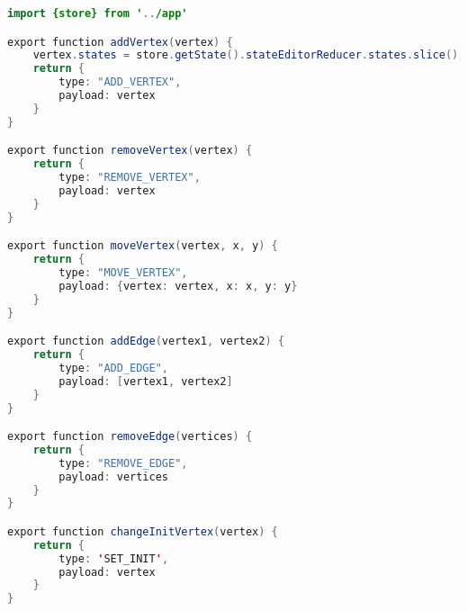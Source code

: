 \begin{lstlisting}[language=Java, 
label=lst:url_assign, 
caption={Создатели действий WorkspaceActions.}]
import {store} from '../app'

export function addVertex(vertex) {
	vertex.states = store.getState().stateEditorReducer.states.slice();
	return {
		type: "ADD_VERTEX",
		payload: vertex
	}
}

export function removeVertex(vertex) {
	return {
		type: "REMOVE_VERTEX",
		payload: vertex
	}
}

export function moveVertex(vertex, x, y) {
	return {
		type: "MOVE_VERTEX",
		payload: {vertex: vertex, x: x, y: y}
	}
}

export function addEdge(vertex1, vertex2) {
	return {
		type: "ADD_EDGE",
		payload: [vertex1, vertex2]
	}
}

export function removeEdge(vertices) {
	return {
		type: "REMOVE_EDGE",
		payload: vertices
	}
}

export function changeInitVertex(vertex) {
	return {
		type: 'SET_INIT',
		payload: vertex
	}
}
\end{lstlisting}

